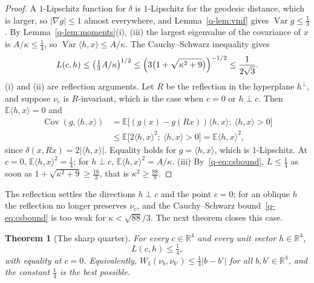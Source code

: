 \documentclass[aps,prd,twocolumn,superscriptaddress,nofootinbib,longbibliography,floatfix,amsmath,amssymb,10pt]{revtex4-2}
\newtheorem{theorem}{Theorem}
\theoremstyle{definition}
\theoremstyle{remark}
\newcommand{\R}{\mathbb{R}}
\newcommand{\E}{\mathbb{E}}
\newcommand{\Cov}{\operatorname{Cov}}
\newcommand{\Var}{\operatorname{Var}}
\newcommand{\ip}[2]{\langle #1,#2\rangle}
\begin{document}
\begin{proof}
A $1$-Lipschitz function for $\delta$ is $1$-Lipschitz for the geodesic
distance, which is larger, so $|\nabla g|\le1$ almost everywhere, and
Lemma~\ref{q-lem:vmf} gives $\Var g\le\frac13$. By Lemma~\ref{q-lem:moments}(i),
(iii) the largest eigenvalue of the covariance of $x$ is $A/\kappa\le\frac14$,
so $\Var\ip hx\le A/\kappa$. The Cauchy--Schwarz inequality gives
\begin{equation}\label{q-eq:csbound}
L(c,h)\le\bigl(\tfrac13A/\kappa\bigr)^{1/2}\le\Bigl(3\bigl(1+
\sqrt{\kappa^2+9}\bigr)\Bigr)^{-1/2}\le\frac1{2\sqrt3}.
\end{equation}
(i) and (ii) are reflection arguments. Let $R$ be the reflection in the
hyperplane $h^\perp$, and suppose $\nu_c$ is $R$-invariant, which is the case
when $c=0$ or $h\perp c$. Then $\E\ip hx=0$ and
\[
\begin{aligned}
\Cov(g,\ip hx)&=\E\bigl[(g(x)-g(Rx))\ip hx;\ \ip hx>0\bigr]\\
&\le\E\bigl[2\ip hx^2;\ \ip hx>0\bigr]=\E\ip hx^2,
\end{aligned}
\]
since $\delta(x,Rx)=2|\ip hx|$. Equality holds for $g=\ip hx$, which is
$1$-Lipschitz. At $c=0$, $\E\ip hx^2=\frac14$; for $h\perp c$, $\E\ip
hx^2=A/\kappa$. (iii) By~\eqref{q-eq:csbound}, $L\le\frac14$ as soon as
$1+\sqrt{\kappa^2+9}\ge\frac{16}3$, that is $\kappa^2\ge\frac{88}9$.
\end{proof}

The reflection settles the directions
$h\perp c$ and the point $c=0$; for an oblique $h$ the reflection no longer
preserves $\nu_c$, and the Cauchy--Schwarz bound~\eqref{q-eq:csbound} is too
weak for $\kappa<\sqrt{88}/3$. The next theorem closes this case.

\begin{theorem}[The sharp quarter]\label{q-thm:quarter}
For every $c\in\R^4$ and every unit vector $h\in\R^4$,
\[
L(c,h)\le\tfrac14 ,
\]
with equality at $c=0$. Equivalently, $W_1(\nu_b,\nu_{b'})\le\frac14|b-b'|$
for all $b,b'\in\R^4$, and the constant $\frac14$ is the best possible.
\end{theorem}
\end{document}
